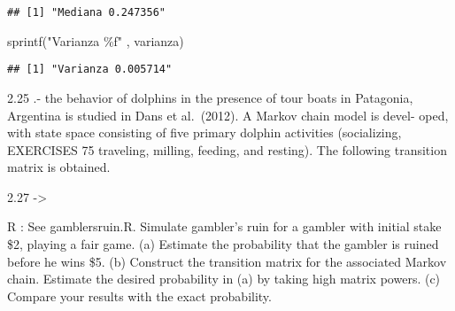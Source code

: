 \documentclass[
]{article}
\newenvironment{Shaded}{\begin{snugshade}}{\end{snugshade}}
\newcommand{\AttributeTok}[1]{\textcolor[rgb]{0.77,0.63,0.00}{#1}}
\newcommand{\CommentTok}[1]{\textcolor[rgb]{0.56,0.35,0.01}{\textit{#1}}}
\newcommand{\ControlFlowTok}[1]{\textcolor[rgb]{0.13,0.29,0.53}{\textbf{#1}}}
\newcommand{\DecValTok}[1]{\textcolor[rgb]{0.00,0.00,0.81}{#1}}
\newcommand{\FunctionTok}[1]{\textcolor[rgb]{0.00,0.00,0.00}{#1}}
\newcommand{\NormalTok}[1]{#1}
\newcommand{\OtherTok}[1]{\textcolor[rgb]{0.56,0.35,0.01}{#1}}
\newcommand{\SpecialCharTok}[1]{\textcolor[rgb]{0.00,0.00,0.00}{#1}}
\newcommand{\StringTok}[1]{\textcolor[rgb]{0.31,0.60,0.02}{#1}}
\begin{document}
\begin{verbatim}
## [1] "Mediana 0.247356"
\end{verbatim}

\begin{Shaded}
\begin{Highlighting}[]
\FunctionTok{sprintf}\NormalTok{(}\StringTok{"Varianza \%f"}\NormalTok{ , varianza)}
\end{Highlighting}
\end{Shaded}

\begin{verbatim}
## [1] "Varianza 0.005714"
\end{verbatim}

2.25 .- the behavior of dolphins in the presence of tour boats in
Patagonia, Argentina is studied in Dans et al.~(2012). A Markov chain
model is devel- oped, with state space consisting of five primary
dolphin activities (socializing, EXERCISES 75 traveling, milling,
feeding, and resting). The following transition matrix is obtained.

2.27 -\textgreater{}

R : See gamblersruin.R. Simulate gambler's ruin for a gambler with
initial stake \$2, playing a fair game. (a) Estimate the probability
that the gambler is ruined before he wins \$5. (b) Construct the
transition matrix for the associated Markov chain. Estimate the desired
probability in (a) by taking high matrix powers. (c) Compare your
results with the exact probability.

\begin{Shaded}
\end{Shaded}
\end{document}
